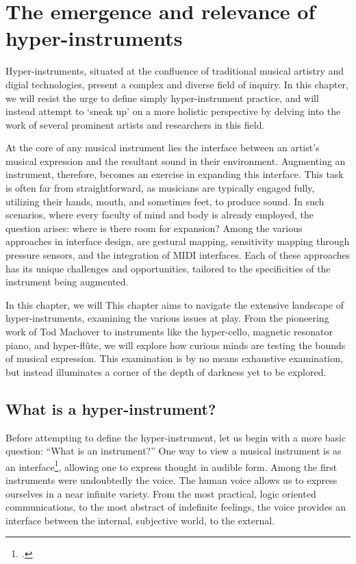 \documentclass[12pt,twoside,maitrise]{dms_ks}
\theoremstyle{definition}
\begin{document}


\chapter{The emergence and relevance of hyper-instruments}

Hyper-instruments, situated at the confluence of traditional musical artistry and digial technologies, present a complex and diverse field of inquiry.
In this chapter, we will resist the urge to define simply hyper-instrument practice, and will instead attempt to `sneak up' on a more holistic perspective by delving into the work of several prominent artists and researchers in this field.

At the core of any musical instrument lies the interface between an artist's musical expression and the resultant sound in their environment.
Augmenting an instrument, therefore, becomes an exercise in expanding this interface.
This task is often far from straightforward, as musicians are typically engaged fully, utilizing their hands, mouth, and sometimes feet, to produce sound.
In such scenarios, where every faculty of mind and body is already employed, the question arises: where is there room for expansion?
Among the various approaches in interface design, are gestural mapping, sensitivity mapping through pressure sensors, and the integration of MIDI interfaces.
Each of these approaches has its unique challenges and opportunities, tailored to the specificities of the instrument being augmented.

In this chapter, we will 
This chapter aims to navigate the extensive landscape of hyper-instruments, examining the various issues at play.
From the pioneering work of Tod Machover to instruments like the hyper-cello, magnetic resonator piano, and hyper-flûte, we will explore how curious minds are testing the bounds of musical expression.
This examination is by no means exhaustive examination, but instead illuminates a corner of the depth of darkness yet to be explored. 

\section{What is a hyper-instrument?}

Before attempting to define the hyper-instrument, let us begin with a more basic question: “What is an instrument?”
One way to view a musical instrument is as an interface\footcite{noauthor_instrument_nodate}, allowing one to express thought in audible form. 
Among the first instruments were undoubtedly the voice. 
The human voice allows us to express ourselves in a near infinite variety.
From the most practical, logic oriented communications, to the most abstract of indefinite feelings, the voice provides an interface between the internal, subjective world, to the external. 
\end{document}
